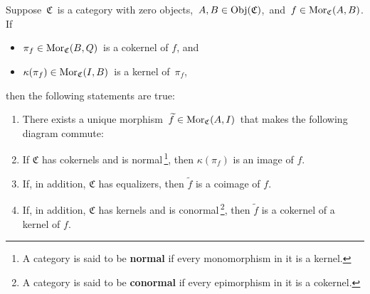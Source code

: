 
\vskip 0.5cm
\begin{proposition}\label{FactorizationIntoImageCoimage}
\mbox{}
\vskip 0.1cm
\noindent
Suppose \,$\mathfrak{C}$\, is a category with zero objects,
\,$A, B \in \textnormal{Obj}(\mathfrak{C})$,\, and
\,$f \in \textnormal{Mor}_{\mathfrak{C}}(A,B)$.
If
\begin{itemize}
\item
	$\pi_{f} \in \textnormal{Mor}_{\mathfrak{C}}(B,Q)$\, is a cokernel of $f$, and
\item
	$\kappa(\pi_{f}) \in \textnormal{Mor}_{\mathfrak{C}}(I,B)$\, is a kernel of \,$\pi_{f}$,
\end{itemize}
then the following statements are true:
\begin{enumerate}
\item
	There exists a unique morphism \,$\widetilde{f} \in \textnormal{Mor}_{\mathfrak{C}}(A,I)$\,
	that makes the following diagram commute: %
	\begin{center}
	\end{center}
\item
	If $\mathfrak{C}$ has cokernels and is
	normal\,\footnote{A category is said to be \textbf{normal} if every monomorphism in it is a kernel.},
	then $\kappa(\pi_{f})$ is an image of $f$.
\item
	If, in addition, $\mathfrak{C}$ has equalizers, then $\widetilde{f}$ is a coimage of $f$.
\item
	If, in addition, $\mathfrak{C}$ has kernels and is
	conormal\,\footnote{A category is said to be \textbf{conormal} if every epimorphism in it is a cokernel.},
	then $\widetilde{f}$ is a cokernel of a kernel of $f$.
\end{enumerate}
\end{proposition}
\proof
